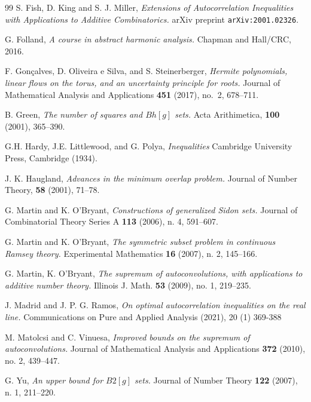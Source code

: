 \documentclass[10pt,reqno]{amsart}
\begin{document}
\begin{thebibliography}{99}
\newblock S. Fish, D. King and S. J. Miller,  
\newblock \emph{Extensions of Autocorrelation Inequalities with Applications to Additive Combinatorics.}
\newblock arXiv preprint \texttt{arXiv:2001.02326}. 

\newblock G. Folland, 
\newblock \emph{A course in abstract harmonic analysis.} 
\newblock Chapman and Hall/CRC, 2016. 



\newblock F. Gon\c{c}alves, D. Oliveira e Silva, and S. Steinerberger,
\newblock \emph{ Hermite polynomials, linear flows on the torus, and an uncertainty principle for roots.} 
\newblock Journal of Mathematical Analysis and Applications {\bf 451} (2017), no.~2, 678--711. 

\newblock B. Green, 
\newblock \emph{The number of squares and $Bh[g]$ sets.}
\newblock Acta Arithimetica, \textbf{100} (2001), 365--390.

\newblock G.H. Hardy, J.E. Littlewood, and G. Polya,
\newblock \emph{Inequalities}
\newblock Cambridge University Press, Cambridge (1934).

\newblock J. K. Haugland, 
\newblock \emph{Advances in the minimum overlap problem.}
\newblock Journal of Number Theory, \textbf{58} (2001), 71--78.

\newblock G. Martin and K. O'Bryant, 
\newblock \emph{Constructions of generalized Sidon sets.}
\newblock Journal of Combinatorial Theory Series A \textbf{113} (2006), n. 4, 591--607.

\newblock G. Martin and K. O'Bryant,
\newblock \emph{The symmetric subset problem in continuous Ramsey theory.}
\newblock Experimental Mathematics \textbf{16} (2007), n. 2, 145--166.

\newblock G. Martin, K. O’Bryant,
\newblock \emph{The supremum of autoconvolutions, with applications to additive
number theory.}
\newblock Illinois J. Math. \textbf{53} (2009), no. 1, 219--235.

\newblock J. Madrid and J. P. G. Ramos, 
\newblock \emph{On optimal autocorrelation inequalities on the real line.}
\newblock Communications on Pure and Applied Analysis (2021), 20 (1) 369-388



\newblock  M. Matolcsi and C. Vinuesa, 
\newblock \emph{Improved bounds on the supremum of autoconvolutions.} 
\newblock Journal of Mathematical Analysis and Applications \textbf{372} (2010), no. 2, 439--447.

\newblock  G. Yu, 
\newblock \emph{An upper bound for $B2[g]$ sets.}
\newblock Journal of Number Theory \textbf{122} (2007), n. 1, 211--220. 


\end{thebibliography}
\end{document}
